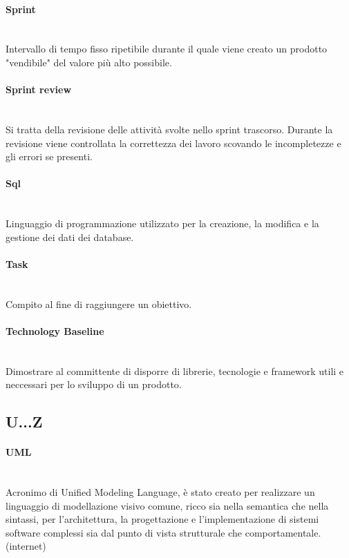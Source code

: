 \paragraph{Sprint}~\smallskip \\
Intervallo di tempo fisso ripetibile durante il quale viene creato un prodotto "vendibile" del valore più alto possibile.

\paragraph{Sprint review}~\smallskip \\
Si tratta della revisione delle attività svolte nello sprint trascorso. Durante la revisione viene controllata la correttezza
dei lavoro scovando le incompletezze e gli errori se presenti.

\paragraph{Sql}~\smallskip \\
Linguaggio di programmazione utilizzato per la creazione, la modifica e la gestione dei dati dei database.

\paragraph{Task}~\smallskip \\
Compito al fine di raggiungere un obiettivo.

\paragraph{Technology Baseline}~\smallskip \\
Dimostrare al committente di disporre di librerie, tecnologie e framework utili e neccessari per lo sviluppo di un prodotto.

\subsection{U...Z}

\paragraph{UML}~\smallskip \\
Acronimo di Unified Modeling Language, è stato creato per realizzare un linguaggio di modellazione visivo comune, ricco 
sia nella semantica che nella sintassi, per l'architettura, la progettazione e l'implementazione di sistemi 
software complessi sia dal punto di vista strutturale che comportamentale. (internet)

